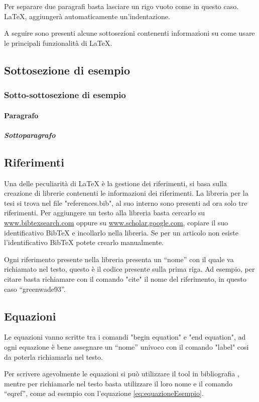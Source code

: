 Per separare due paragrafi basta lasciare un rigo vuoto come in questo caso. LaTeX, aggiungerà automaticamente un’indentazione.

A seguire sono presenti alcune sottosezioni contenenti informazioni su come usare le principali funzionalità di LaTeX.

\subsection{Sottosezione di esempio}
\subsubsection{Sotto-sottosezione di esempio}
\paragraph{Paragrafo}
\subparagraph{Sottoparagrafo}

\subsection{Riferimenti}

Una delle peculiarità di LaTeX è la gestione dei riferimenti, si basa sulla creazione di librerie contenenti le informazioni dei riferimenti. La libreria per la tesi si trova nel file "references.bib", al suo interno sono presenti ad ora solo tre riferimenti. Per aggiungere un testo alla libreria basta cercarlo su \url{www.bibtexsearch.com} oppure su \url{www.scholar.google.com}, copiare il suo identificativo BibTeX e incollarlo nella libreria. Se per un articolo non esiste l’identificativo BibTeX potete crearlo manualmente.

Ogni riferimento presente nella libreria presenta un “nome” con il quale va richiamato nel testo, questo è il codice presente sulla prima riga. Ad esempio, per citare \cite{greenwade93} basta richiamare con il comando "cite" il nome del riferimento, in questo caso “greenwade93”.

\subsection{Equazioni}
Le equazioni vanno scritte tra i comandi "begin equation" e "end equation", ad ogni equazione è bene assegnare un “nome” univoco con il comando "label" cosi da poterla richiamarla nel testo.

Per scrivere agevolmente le equazioni si può utilizzare il tool in bibliografia \cite{codecogs}, mentre per richiamarle nel testo basta utilizzare il loro nome e il comando “eqref”, come ad esempio con l'equazione \eqref{eq:equazioneEsempio}. 

